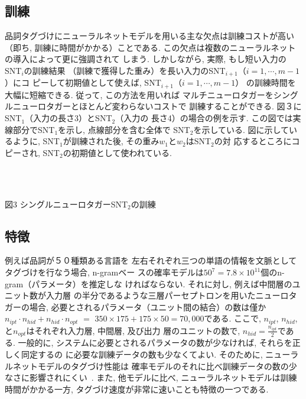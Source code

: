 \subsection{訓練}
品詞タグづけにニューラルネットモデルを用いる主な欠点は訓練コストが高い
（即ち, 訓練に時間がかかる）ことである.
この欠点は複数のニューラルネットの導入によって更に強調されて
しまう.
しかしながら, 実際,
もし短い入力のSNT$_{i}$の訓練結果
（訓練で獲得した重み）を長い入力のSNT$_{i+1}$（$i=1, \cdots, m-1$）にコ
ピーして初期値として使えば, SNT$_{i+1}$（$i=1, \cdots, m-1$）
の訓練時間を大幅に短縮できる. 従って, この方法を用いれば
マルチニューロタガーをシングルニューロタガーとほとんど変わらないコストで
訓練することができる. 図３にSNT$_{1}$（入力の長さ3）とSNT$_{2}$（入力の
長さ4）の場合の例を示す.
この図では実線部分でSNT$_{1}$を示し, 点線部分を含む全体で
SNT$_{2}$を示している. 図に示しているように, SNT$_{1}$が訓練された後, 
その重み$w_{1}$と$w_{2}$はSNT$_{2}$の対
応するところにコピーされ, SNT$_{2}$の初期値として使われている.
\begin{center}
\begin{minipage}[t]{8cm}
 \\
\end{minipage}
\\図3 シングルニューロタガーSNT$_{2}$の訓練
\end{center}

\subsection{特徴}
例えば品詞が５０種類ある言語を
左右それぞれ三つの単語の情報を文脈としてタグづけを行なう場合, n-gramベー
スの確率モデルは$50^{7}=7.8 \times 10^{11}$個のn-gram（パラメータ）を推定しな
ければならない. それに対し, 例えば中間層のユニット数が入力層
の半分であるような三層パーセプトロンを用いたニューロタガーの場合, 
必要とされるパラメータ（ユニット間の結合）の数は僅か$n_{ipt} \cdot n_{hid} + 
n_{hid} \cdot n_{opt}$ $=$ $350 \times 175 + 175 \times 50=70,000$である. 
ここで, $n_{ipt}$, $n_{hid}$, と$n_{opt}$はそれぞれ入力層, 中間層, 及び出力
層のユニットの数で, $n_{hid}=\frac{n_{ipt}}{2}$である. 
一般的に, システムに必要とされるパラメータの数が少なければ, それらを正しく同定するの
に必要な訓練データの数も少なくてよい.
そのために, ニューラルネットモデルのタグづけ性能は
確率モデルのそれに比べ訓練データの数の少なさに影響されにくい~\cite{schmid}.
また, 他モデルに比べ, ニューラルネットモデルは訓練時間がかかる一方, 
タグづけ速度が非常に速いことも特徴の一つである.

